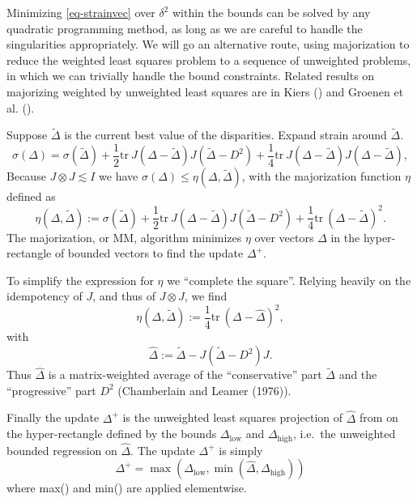 \documentclass[
  12pt,
  letterpaper,
  DIV=11,
  numbers=noendperiod]{scrartcl}
\begin{document}
Minimizing \eqref{eq-strainvec} over \(\delta^2\) within the bounds can
be solved by any quadratic programming method, as long as we are careful
to handle the singularities appropriately. We will go an alternative
route, using majorization to reduce the weighted least squares problem
to a sequence of unweighted problems, in which we can trivially handle
the bound constraints. Related results on majorizing weighted by
unweighted least squares are in Kiers ()
and Groenen et al. ().

Suppose \(\tilde\Delta\) is the current best value of the disparities.
Expand strain around \(\tilde\Delta\). \begin{equation}
\sigma(\Delta)=\sigma(\tilde\Delta)+\frac12\text{tr}\ J(\Delta-\tilde\Delta)J(\tilde\Delta-D^2)+\frac14\text{tr}\ J(\Delta-\tilde\Delta)J(\Delta-\tilde\Delta), \label{eq-strexpand}
\end{equation} Because \(J\otimes J\lesssim I\) we have
\(\sigma(\Delta)\leq\eta(\Delta,\tilde\Delta)\), with the majorization
function \(\eta\) defined as \begin{equation}
\eta(\Delta,\tilde\Delta):=\sigma(\tilde\Delta) +\frac12\text{tr}\  J(\Delta-\tilde\Delta)J(\tilde\Delta-D^2) +\frac14\text{tr}\ (\Delta-\tilde\Delta)^2.\label{eq-etadef}
\end{equation} The majorization, or MM, algorithm minimizes \(\eta\)
over vectors \(\Delta\) in the hyper-rectangle of bounded vectors to
find the update \(\Delta^+\).

To simplify the expression for \(\eta\) we ``complete the square''.
Relying heavily on the idempotency of \(J\), and thus of \(J\otimes J\),
we find \begin{equation}
\eta(\Delta,\tilde\Delta):=\frac14\text{tr}\ (\Delta-\hat\Delta)^2,\label{eq-etasimp}
\end{equation} with \begin{equation}
\hat\Delta:=\tilde\Delta-J(\tilde\Delta-D^2)J.\label{hdeltadef}
\end{equation} Thus \(\hat\Delta\) is a matrix-weighted average of the
``conservative'' part \(\tilde\Delta\) and the ``progressive'' part
\(D^2\) (Chamberlain and Leamer (1976)).

Finally the update \(\Delta^+\) is the unweighted least squares
projection of \(\hat\Delta\) from \label{hdeltadef} on the
hyper-rectangle defined by the bounds \(\Delta_{\text{low}}\) and
\(\Delta_{\text{high}}\), i.e.~the unweighted bounded regression on
\(\hat\Delta\). The update \(\Delta^+\) is simply \begin{equation}
\Delta^+=\max(\Delta_{\text{low}},\min(\hat\Delta, \Delta_{\text{high}}))
\end{equation} where max() and min() are applied elementwise.
\end{document}
